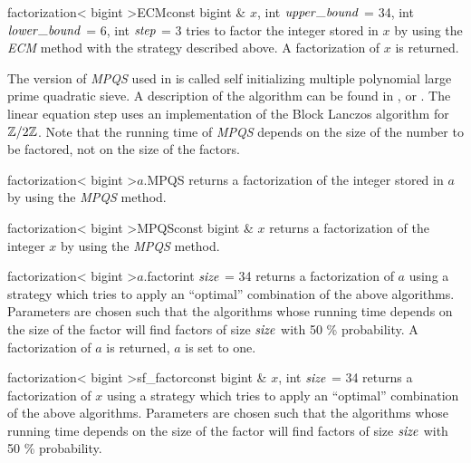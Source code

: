 \begin{fcode}{factorization< bigint >}{ECM}{const bigint & $x$,
    int $\upperbound$ = 34, int $\lowerbound$ = 6, int $\mathit{step}$ = 3}
  tries to factor the integer stored in $x$ by using the \emph{ECM} method with the strategy
  described above.  A factorization of $x$ is returned.
\end{fcode}

The version of \emph{MPQS} used in \LiDIA is called self initializing multiple polynomial large
prime quadratic sieve.  A description of the algorithm can be found in
\cite{Alford/Pomerance:1993}, \cite{Denny_Thesis:1993} or \cite{Sosnowski_Thesis:1994}.  The
linear equation step uses an implementation of the Block Lanczos algorithm for $\mathbb{Z}/2\mathbb{Z}$.
Note that the running time of \emph{MPQS} depends on the size of the number to be factored, not
on the size of the factors.

\begin{fcode}{factorization< bigint >}{$a$.MPQS}{}
  returns a factorization of the integer stored in $a$ by using the \emph{MPQS} method.
\end{fcode}

\begin{fcode}{factorization< bigint >}{MPQS}{const bigint & $x$}
  returns a factorization of the integer $x$ by using the \emph{MPQS} method.
\end{fcode}



\begin{cfcode}{factorization< bigint >}{$a$.factor}{int $\mathit{size}$ = 34}
  returns a factorization of $a$ using a strategy which tries to apply an ``optimal''
  combination of the above algorithms.  Parameters are chosen such that the algorithms whose
  running time depends on the size of the factor will find factors of size $\mathit{size}$ with 50 \%
  probability.  A factorization of $a$ is returned, $a$ is set to one.
\end{cfcode}

\begin{fcode}{factorization< bigint >}{sf_factor}{const bigint & $x$, int $\mathit{size}$ = 34}
  returns a factorization of $x$ using a strategy which tries to apply an ``optimal''
  combination of the above algorithms.  Parameters are chosen such that the algorithms whose
  running time depends on the size of the factor will find factors of size $\mathit{size}$ with 50 \%
  probability.
\end{fcode}

